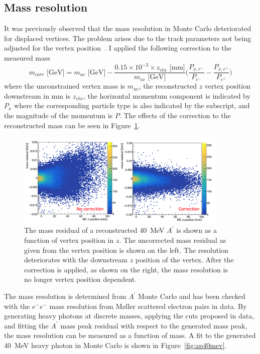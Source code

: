 \subsection{Mass resolution}
It was previously observed that the mass resolution in Monte Carlo deteriorated for displaced vertices. The problem arises due to the track parameters not being adjusted for the vertex position~\cite{billoir_fast_1992}. I applied the following correction to the measured mass
\begin{equation}
\label{eq:massCorrection}
m_{corr} \textrm{ [GeV]}= m_{uc}\textrm{ [GeV]} - \dfrac{0.15\times 10^{-3}\times z_{vtx}\textrm{ [mm]}}{m_{uc}\textrm{ [GeV]}}\big(\dfrac{P_{x,e^-}}{P_{e^-}}-\dfrac{P_{x,e^+}}{P_{e^+}}\big)            
\end{equation}
where the unconstrained vertex mass is $m_{uc}$, the reconstructed $z$ vertex position downstream in mm is $z_{vtx}$, the horizontal momentum component is indicated by $P_x$ where the corresponding particle type is also indicated by the subscript, and the magnitude of the momentum is $P$. The effects of the correction to the reconstructed mass can be seen in Figure~\ref{fig:effectMCorr}.
\begin{figure}[htb]
  \centering
      \includegraphics[width=0.9\textwidth]{pics/searching/massCorrection.png}
  \caption[Correction to the reconstructed mass for a 40~MeV $A^{\prime}$]{The mass residual of a reconstructed 40~MeV $A^{\prime}$ is shown as a function of vertex position in $z$. The uncorrected mass residual as given from the vertex position is shown on the left. The resolution deteriorates with the downstream $z$ position of the vertex. After the correction is applied, as shown on the right, the mass resolution is no longer vertex position dependent.}
  \label{fig:effectMCorr}
\end{figure} 
The mass resolution is determined from $A^{\prime}$ Monte Carlo and has been checked with the $e^-e^-$ mass resolution from M\o ller scattered electron pairs in data. By generating heavy photons at discrete masses, applying the cuts proposed in data, and fitting the $A^{\prime}$ mass peak residual with respect to the generated mass peak, the mass resolution can be measured as a function of mass. A fit to the generated 40~MeV heavy photon in Monte Carlo is shown in Figure~\ref{fig:ap40mev}.
